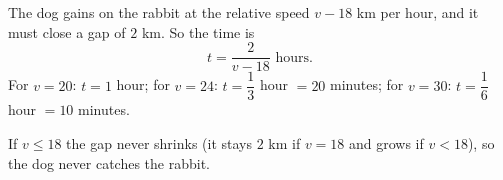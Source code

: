 The dog gains on the rabbit at the relative speed $v-18$ km per hour, and it must close a gap of $2$ km. So the time is
\[
t=\boxed{\dfrac{2}{v-18}\text{ hours}} .
\]
For $v=20$: $t=1$ hour; for $v=24$: $t=\dfrac{1}{3}$ hour $=20$ minutes; for $v=30$: $t=\dfrac{1}{6}$ hour $=10$ minutes.

If $v\le18$ the gap never shrinks (it stays $2$ km if $v=18$ and grows if $v<18$), so the dog never catches the rabbit.
